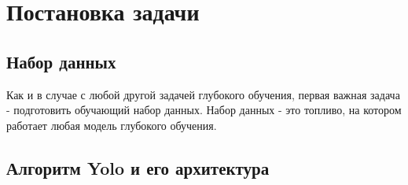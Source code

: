 \documentclass[12pt,a4paper]{article}
\author{И.А.Ниженко}
\newcommand{\названиеРаботы}
{Разработка модели сверточной нейронной сети, обученную на сгенерированных размеченных данных СКТ}
\newcommand{\идРаботы}
{8888.00.0019-0019/001}
\newcommand{\темаРаботы}
{СКТ}
\newcommand{\номерСлужебки}
{}
\newcommand{\ДолжностьАвтораОтчета}{Инженер}
\newcommand{\НашОтдел}{Научно-исследовательский центр суперкомпьютерных технологий}
\newcommand{\НазваниеДокумента}{Служебная записка}
\newcommand{\КомуСлужебкаДолжность}{Заместителю технического директора}
\newcommand{\КомуСлужебкаФИО}{Никитушкину М.В.}
\newcommand{\ОтКогоСлужебкаДолжность}{\ДолжностьАвтораОтчета}
\newcommand{\ОтКогоСлужебкаФИО}{Ниженко И.А.}
\newcommand{\ИсполнительФИО}{Ниженко И.А. \\тел.:    75-39}
\begin{document}
	
	\newpage
	\generatePageLayouts{}
	\switchToLayoutPageAfour{}
	\tableofcontents
	\newpage
	\section{Постановка задачи}
	\newpage
	\subsection{Набор данных}
	Как и в случае с любой другой задачей глубокого обучения, первая важная задача - подготовить обучающий набор данных. Набор данных - это топливо, на котором работает любая модель глубокого обучения.
	\newpage
	\subsection{Алгоритм Yolo и его архитектура}
	
	\newpage
\end{document}
